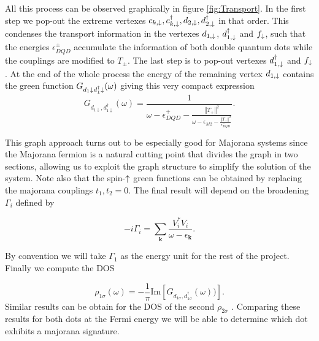 \documentclass[showpacs,aps,prb,reprint,superscriptaddress]{revtex4-1}
\begin{document}
All this process can be observed graphically in figure \ref{fig:Transport}. In the first step we pop-out the extreme vertexes $c_{k,\downarrow},c_{k,\downarrow}^\dagger , d_{2,\downarrow} , d^\dagger_{2,\downarrow}$  in that order. This condenses the transport information in the vertexes  $d_{1,\downarrow}$, $d_{1,\downarrow}^\dagger$ and $f_\downarrow$, such that the energies $\epsilon^{\pm}_{DQD}$ accumulate the information of both double quantum dots while the couplings are modified to $T_\pm$. The last step is to pop-out vertexes $d_{1,\downarrow}^\dagger$ and $f_{\downarrow}$. At the end of the whole process the energy of the remaining vertex $d_{1,\downarrow}$ contains the green function $G_{d_1\downarrow d^\dagger_1\downarrow }(\omega) $ giving this very compact expression
\begin{equation}
    G_{{d_{1\downarrow},d_{1\downarrow}^{\dagger}}}\left(\omega\right)=\frac{1}{\omega-\epsilon_{DQD}^{+}-\frac{\left\Vert T_{+}\right\Vert ^{2}}{\omega-\epsilon_{M2}-\frac{\left\Vert T_{-}\right\Vert ^{2}}{\epsilon_{DQD}^{-}}}}.
    \label{eq:Green_NonInteracting}
\end{equation}


This graph approach turns out to be especially good for Majorana systems  since the Majorana fermion is a natural cutting point that divides the graph in two sections,  allowing us to exploit the graph structure to simplify the solution of the system. Note also that the spin-$\uparrow$ green functions  can be obtained by replacing the majorana couplings $t_1,t_2 = 0$. The final result will depend on the broadening $\Gamma_i$ defined by 

\begin{equation}
   -i\Gamma_i = \sum_{\boldsymbol{k}}\frac{V_{i}^{*}V_{i}}{\omega-\epsilon_{\boldsymbol{k}}}.
\end{equation}

By convention we will take $\Gamma_1$ as the energy unit for the rest of the project. Finally we compute the DOS 


\begin{equation}
    \rho_{1\sigma}(\omega)=-\frac{1}{\pi} \textrm{Im} \left[G_{d_{1\sigma},d_{1\sigma}^\dagger}(\omega))\right].
    \label{eq:Density of States}
\end{equation}
Similar results can be obtain for the DOS of the second $\rho_{2\sigma}$ . Comparing these results for both dots at the Fermi energy we will be able to determine which dot exhibits a majorana signature.
\end{document}
